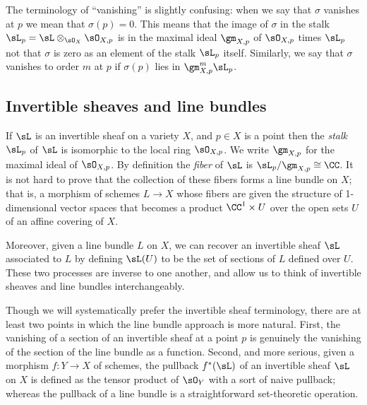 The terminology of ``vanishing'' is slightly confusing: when we  say that $\sigma$ vanishes at $p$ we mean
that $\sigma(p) = 0$. This means that the image of $\sigma$ in the stalk $\sL_p = \sL \otimes_{\sO_{X}} \sO_{X,p}$ is in 
the maximal ideal $\gm_{X,p}$ of $\sO_{X,p}$ times $\sL_p$
not that $\sigma$ is zero
as an element of the stalk $\sL_p$ itself. Similarly, we say that $\sigma$ vanishes to order $m$ at $p$ if $\sigma(p)$ lies in $\gm_{X,p}^m\sL_p$. 

\subsection{Invertible sheaves and line bundles}

If $\sL$ is an invertible sheaf on a variety $X$, and $p\in X$ is a point then the \emph{stalk} $\sL_p$ of $\sL$ is isomorphic to the local
ring $\sO_{X,p}$. We write $\gm_{X,p}$ for the maximal ideal of $\sO_{X,p}$. By definition the \emph{fiber} of $\sL$ is 
$\sL_p/\gm_{X,p}\cong \CC$. It is not hard to prove that the collection of these fibers forms a line bundle on $X$; that is,
a morphism of schemes $L \to X$ whose fibers are given the structure of 1-dimensional vector spaces that becomes
a product $\CC^1 \times U$ over the open sets $U$ of an affine covering of $X$.

Moreover,
given a line bundle $L$ on $X$, we can recover an invertible sheaf $\sL$ associated to $L$ by defining
$\sL(U)$ to be the set of sections of $L$ defined over $U$. These two processes are inverse to one another, and allow
us to think of invertible sheaves and line bundles interchangeably.

Though we will systematically prefer the invertible sheaf terminology, there are at least two points in which the line bundle approach is more natural. First,  the vanishing of a section of an invertible sheaf at a point $p$ is genuinely the vanishing of the 
section of the line bundle as a function. Second, and more serious, given a morphism $f: Y\to X$ of schemes, the 
pullback $f^*(\sL)$ of an invertible sheaf $\sL$ on $X$ is defined as the tensor product of $\sO_Y$ with a sort of naive pullback; whereas the pullback of a line bundle is a straightforward set-theoretic operation.

